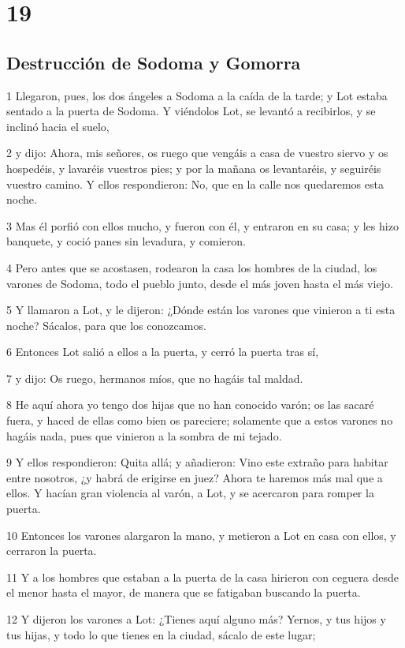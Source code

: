\chapter{19}

\section{Destrucción de Sodoma y Gomorra}

1 Llegaron, pues, los dos ángeles a Sodoma a la caída de la tarde; y Lot estaba sentado a la puerta de Sodoma. Y viéndolos Lot, se levantó a recibirlos, y se inclinó hacia el suelo,

2 y dijo: Ahora, mis señores, os ruego que vengáis a casa de vuestro siervo y os hospedéis, y lavaréis vuestros pies; y por la mañana os levantaréis, y seguiréis vuestro camino. Y ellos respondieron: No, que en la calle nos quedaremos esta noche.

3 Mas él porfió con ellos mucho, y fueron con él, y entraron en su casa; y les hizo banquete, y coció panes sin levadura, y comieron.

4 Pero antes que se acostasen, rodearon la casa los hombres de la ciudad, los varones de Sodoma, todo el pueblo junto, desde el más joven hasta el más viejo.

5 Y llamaron a Lot, y le dijeron: ¿Dónde están los varones que vinieron a ti esta noche? Sácalos, para que los conozcamos.

6 Entonces Lot salió a ellos a la puerta, y cerró la puerta tras sí,

7 y dijo: Os ruego, hermanos míos, que no hagáis tal maldad.

8 He aquí ahora yo tengo dos hijas que no han conocido varón; os las sacaré fuera, y haced de ellas como bien os pareciere; solamente que a estos varones no hagáis nada, pues que vinieron a la sombra de mi tejado.

9 Y ellos respondieron: Quita allá; y añadieron: Vino este extraño para habitar entre nosotros, ¿y habrá de erigirse en juez? Ahora te haremos más mal que a ellos. Y hacían gran violencia al varón, a Lot, y se acercaron para romper la puerta.

10 Entonces los varones alargaron la mano, y metieron a Lot en casa con ellos, y cerraron la puerta.

11 Y a los hombres que estaban a la puerta de la casa hirieron con ceguera desde el menor hasta el mayor, de manera que se fatigaban buscando la puerta.

12 Y dijeron los varones a Lot: ¿Tienes aquí alguno más? Yernos, y tus hijos y tus hijas, y todo lo que tienes en la ciudad, sácalo de este lugar;

